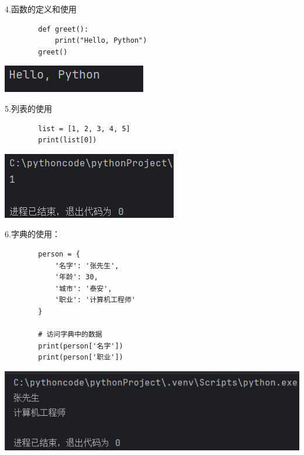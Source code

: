 \documentclass{article}
\begin{document}
	4.函数的定义和使用
	\begin{verbatim}
		def greet():
			print("Hello, Python") 
		greet()
	\end{verbatim}
	
	\noindent
	\begin{minipage}{\linewidth}
		\centering
		\includegraphics[width=0.5\linewidth]{example4.png}
		\label{fig:example}
	\end{minipage}
	
	
	
	5.列表的使用
	\begin{verbatim}
		list = [1, 2, 3, 4, 5]
		print(list[0])
	\end{verbatim}
	
	
	\noindent
	\begin{minipage}{\linewidth}
		\centering
		\includegraphics[width=0.5\linewidth]{example5.png}
		\label{fig:example}
	\end{minipage}
	
	6.字典的使用：
	\begin{verbatim}
		person = {
			'名字': '张先生',
			'年龄': 30,
			'城市': '泰安',
			'职业': '计算机工程师'
		}
		
		# 访问字典中的数据
		print(person['名字'])  
		print(person['职业'])
	\end{verbatim}
	
	
	
	\noindent
	\begin{minipage}{\linewidth}
		\centering
		\includegraphics[width=0.5\linewidth]{example6.png}
		\label{fig:example}
	\end{minipage}
	
\end{document}

